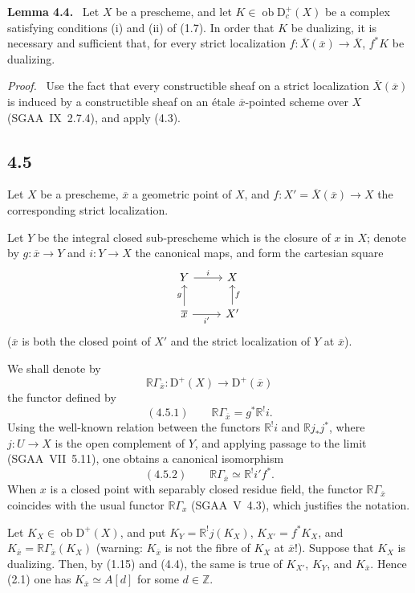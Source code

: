 \documentclass[11pt]{article}
\newenvironment{statement}[1]{\par\medskip\noindent\textbf{#1.}\ }{\par\medskip}
\newenvironment{prooftext}[1][Proof]{\par\noindent\emph{#1.}\ }{\par\medskip}
\newcommand{\D}{\mathrm{D}}
\newcommand{\Z}{\mathbb{Z}}
\newcommand{\ob}{\operatorname{ob}}
\newcommand{\ol}[1]{\overline{#1}}
\providecommand{\ob}{\operatorname{ob}}
\providecommand{\Z}{\mathbb Z}
\begin{document}
\begin{statement}{Lemma 4.4}
Let $X$ be a prescheme, and let $K\in\ob\D_c^+(X)$ be a complex satisfying conditions (i) and (ii) of (1.7). In order that $K$ be dualizing, it is necessary and sufficient that, for every strict localization $f:\ol{X}(\ol{x})\to \ol{X}$, $f^*K$ be dualizing.
\end{statement}

\begin{prooftext}[Proof]
Use the fact that every constructible sheaf on a strict localization $\ol{X}(\ol{x})$ is induced by a constructible sheaf on an étale $\ol{x}$-pointed scheme over $X$ (SGAA~IX~2.7.4), and apply (4.3).
\end{prooftext}

\subsection*{4.5}
Let $X$ be a prescheme, $\ol{x}$ a geometric point of $X$, and $f:X'=\ol{X}(\ol{x})\to X$ the corresponding strict localization.

Let $Y$ be the integral closed sub-prescheme which is the closure of $x$ in $X$; denote by $g:\ol{x}\to Y$ and $i:Y\to X$ the canonical maps, and form the cartesian square
\[
\begin{tikzcd}
Y \arrow[r,"i"] & X \\
\ol{x} \arrow[u,"g"] \arrow[r,"i'"'] & X' \arrow[u,"f"']
\end{tikzcd}
\]
($\ol{x}$ is both the closed point of $X'$ and the strict localization of $Y$ at $\ol{x}$).

We shall denote by
\[
\mathbb{R}\Gamma_{\ol{x}}:\D^+(X)\longrightarrow \D^+(\ol{x})
\]
the functor defined by
\[
(4.5.1)\qquad \mathbb{R}\Gamma_{\ol{x}}=g^*\mathbb{R}^{!}i.
\]
Using the well-known relation between the functors $\mathbb{R}^{!}i$ and $\mathbb{R} j_*j^*$, where $j:U\to X$ is the open complement of $Y$, and applying passage to the limit (SGAA~VII~5.11), one obtains a canonical isomorphism
\[
(4.5.2)\qquad \mathbb{R}\Gamma_{\ol{x}}\simeq\mathbb{R}^{!}i' f^*.
\]
When $x$ is a closed point with separably closed residue field, the functor $\mathbb{R}\Gamma_{\ol{x}}$ coincides with the usual functor $\mathbb{R}\Gamma_x$ (SGAA~V~4.3), which justifies the notation.

Let $K_X\in\ob\D^+(X)$, and put $K_Y=\mathbb{R}^{!}j(K_X)$, $K_{X'}=f^*K_X$, and $K_{\ol{x}}=\mathbb{R}\Gamma_{\ol{x}}(K_X)$ (warning: $K_{\ol{x}}$ is not the fibre of $K_X$ at $\ol{x}$!). Suppose that $K_X$ is dualizing. Then, by (1.15) and (4.4), the same is true of $K_{X'}$, $K_Y$, and $K_{\ol{x}}$. Hence (2.1) one has $K_{\ol{x}}\simeq A[d]$ for some $d\in\Z$.
\end{document}
